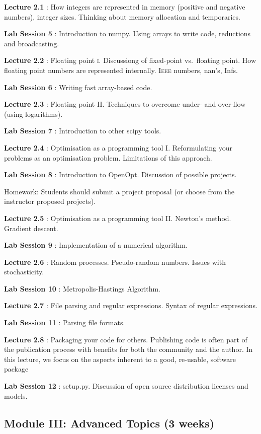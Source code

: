 \documentclass{article}
\newcommand*{\Lecture}[1]{%
{\bf #1}%
}
\begin{document}
\Lecture{Lecture 2.1}: How integers are represented in memory (positive and negative numbers), integer sizes. Thinking about memory allocation and temporaries.

\Lecture{Lab Session 5}: Introduction to numpy. Using arrays to write code, reductions and broadcasting.

\Lecture{Lecture 2.2}:  Floating point \textsc{i}. Discussiong of fixed-point vs.\ floating point. How floating point numbers are represented internally. \textsc{Ieee} numbers, nan's, Infs.

\Lecture{Lab Session 6}: Writing fast array-based code. 

\Lecture{Lecture 2.3}: Floating point II. Techniques to overcome under- and over-flow (using logarithms).

\Lecture{Lab Session 7}: Introduction to other scipy tools.

\Lecture{Lecture 2.4}: Optimisation as a programming tool I. Reformulating your problems as an optimisation problem. Limitations of this approach.

\Lecture{Lab Session 8}: Introduction to OpenOpt. Discussion of possible projects.

Homework: Students should submit a project proposal (or choose from the instructor proposed projects).

\Lecture{Lecture 2.5}: Optimisation as a programming tool II. Newton's method. Gradient descent.

\Lecture{Lab Session 9}: Implementation of a numerical algorithm.

\Lecture{Lecture 2.6}: Random processes. Pseudo-random numbers. Issues with stochasticity.

\Lecture{Lab Session 10}: Metropolis-Hastings Algorithm.

\Lecture{Lecture 2.7}: File parsing and regular expressions. Syntax of regular expressions.

\Lecture{Lab Session 11}: Parsing file formats.

\Lecture{Lecture 2.8}: Packaging your code for others. Publishing code is often part of the publication process with benefits for both the community and the author. In this lecture, we focus on the aspects inherent to a good, re-usable, software package

\Lecture{Lab Session 12}: setup.py. Discussion of open source distribution licenses and models.

\subsection{Module III: Advanced Topics (3 weeks)}
\end{document}
